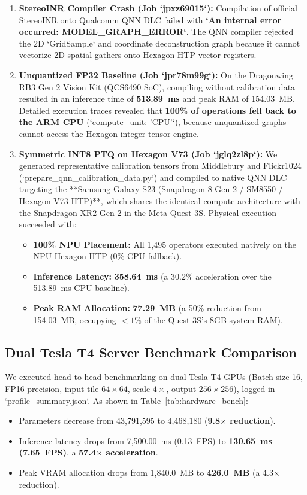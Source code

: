 \documentclass[conference]{IEEEtran}
\begin{document}
\begin{enumerate}
    \item \textbf{StereoINR Compiler Crash (Job `jpxz69015`):} Compilation of official StereoINR onto Qualcomm QNN DLC failed with \textbf{`An internal error occurred: MODEL\_GRAPH\_ERROR`}. The QNN compiler rejected the 2D `GridSample` and coordinate deconstruction graph because it cannot vectorize 2D spatial gathers onto Hexagon HTP vector registers.
    \item \textbf{Unquantized FP32 Baseline (Job `jpr78m99g`):} On the Dragonwing RB3 Gen 2 Vision Kit (QCS6490 SoC), compiling without calibration data resulted in an inference time of \textbf{513.89~ms} and peak RAM of 154.03~MB. Detailed execution traces revealed that \textbf{100\% of operations fell back to the ARM CPU} (`compute\_unit: 'CPU'`), because unquantized graphs cannot access the Hexagon integer tensor engine.
    \item \textbf{Symmetric INT8 PTQ on Hexagon V73 (Job `jglq2zl8p`):} We generated representative calibration tensors from Middlebury and Flickr1024 (`prepare_qnn_calibration_data.py`) and compiled to native QNN DLC targeting the **Samsung Galaxy S23 (Snapdragon 8 Gen 2 / SM8550 / Hexagon V73 HTP)**, which shares the identical compute architecture with the Snapdragon XR2 Gen 2 in the Meta Quest 3S. Physical execution succeeded with:
    \begin{itemize}
        \item \textbf{100\% NPU Placement:} All 1,495 operators executed natively on the NPU Hexagon HTP (0\% CPU fallback).
        \item \textbf{Inference Latency:} \textbf{358.64~ms} (a 30.2\% acceleration over the 513.89~ms CPU baseline).
        \item \textbf{Peak RAM Allocation:} \textbf{77.29~MB} (a 50\% reduction from 154.03~MB, occupying $<1\%$ of the Quest 3S's 8GB system RAM).
    \end{itemize}
\end{enumerate}

\subsection{Dual Tesla T4 Server Benchmark Comparison}
\label{sec:tesla_profiling}
We executed head-to-head benchmarking on dual Tesla T4 GPUs (Batch size 16, FP16 precision, input tile $64 \times 64$, scale $4\times$, output $256 \times 256$), logged in `profile\_summary.json`. As shown in Table~\ref{tab:hardware_bench}:
\begin{itemize}
    \item Parameters decrease from 43,791,595 to 4,468,180 (\textbf{9.8$\times$ reduction}).
    \item Inference latency drops from 7,500.00~ms (0.13~FPS) to \textbf{130.65~ms (7.65~FPS)}, a \textbf{57.4$\times$ acceleration}.
    \item Peak VRAM allocation drops from 1,840.0~MB to \textbf{426.0~MB} (a 4.3$\times$ reduction).
\end{itemize}
\end{document}
